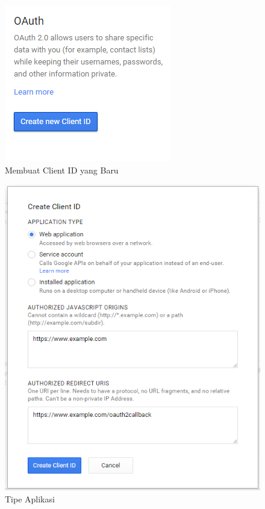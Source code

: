 \begin{figure}[H]
\centering
\includegraphics[scale=1]{Gambar/newclientid.png}
\caption[Membuat Client ID yang Baru]{Membuat Client ID yang Baru} 
\label{fig:newclientid}
\end{figure}

\begin{figure}[H]
\centering
\includegraphics[scale=1]{Gambar/tipeaplikasi.png}
\caption[Tipe Aplikasi]{Tipe Aplikasi} 
\label{fig:tipeaplikasi}
\end{figure}

